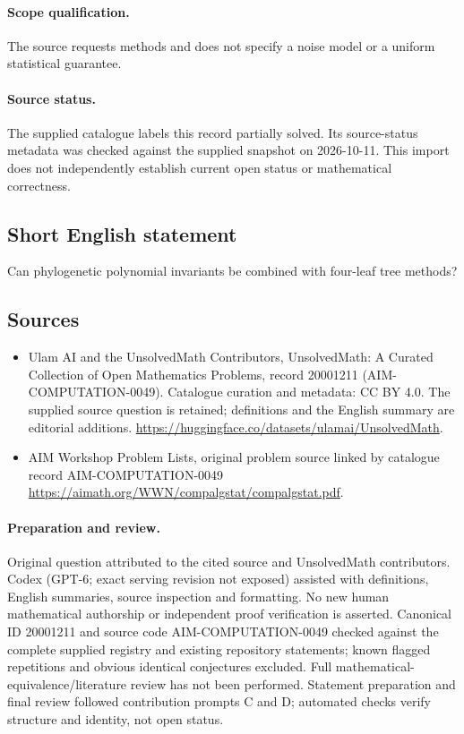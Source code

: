 \documentclass[11pt]{article}
\begin{document}
\paragraph{Scope qualification.}
The source requests methods and does not specify a noise model or a uniform statistical guarantee.
\paragraph{Source status.}
The supplied catalogue labels this record partially solved. Its source-status metadata was checked against the supplied snapshot on 2026-10-11. This import does not independently establish current open status or mathematical correctness.
\subsection{Short English statement}
Can phylogenetic polynomial invariants be combined with four-leaf tree methods?
\subsection{Sources}
\begin{itemize}
\item[S1] Ulam AI and the UnsolvedMath Contributors, UnsolvedMath: A Curated Collection of Open Mathematics Problems, record 20001211 (AIM-COMPUTATION-0049). Catalogue curation and metadata: CC BY 4.0. The supplied source question is retained; definitions and the English summary are editorial additions.
\url{https://huggingface.co/datasets/ulamai/UnsolvedMath}.
\item[S2] AIM Workshop Problem Lists, original problem source linked by catalogue record AIM-COMPUTATION-0049
\url{https://aimath.org/WWN/compalgstat/compalgstat.pdf}.
\end{itemize}
\paragraph{Preparation and review.}
Original question attributed to the cited source and UnsolvedMath contributors. Codex (GPT-6; exact serving revision not exposed) assisted with definitions, English summaries, source inspection and formatting. No new human mathematical authorship or independent proof verification is asserted. Canonical ID 20001211 and source code AIM-COMPUTATION-0049 checked against the complete supplied registry and existing repository statements; known flagged repetitions and obvious identical conjectures excluded. Full mathematical-equivalence/literature review has not been performed. Statement preparation and final review followed contribution prompts C and D; automated checks verify structure and identity, not open status.
\label{end:20001211}
\end{document}
